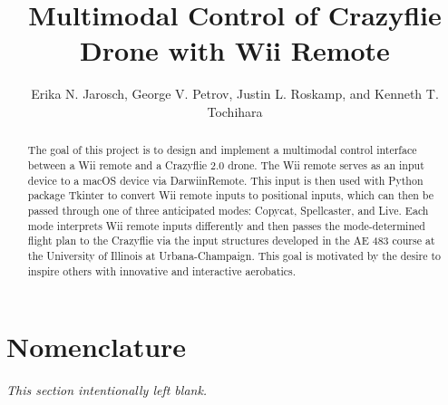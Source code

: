 \documentclass[conf]{new-aiaa}
\title{Multimodal Control of Crazyflie Drone with Wii Remote}
\author{Erika N. Jarosch, George V. Petrov, Justin L. Roskamp, and Kenneth T. Tochihara}
\affil{University of Illinois at Urbana-Champaign, Urbana, IL, 61820}
\begin{document}
\maketitle

\begin{abstract}
The goal of this project is to design and implement a multimodal control interface between a Wii remote and a Crazyflie 2.0 drone. The Wii remote serves as an input device to a macOS device via DarwiinRemote. This input is then used with Python package Tkinter to convert Wii remote inputs to positional inputs, which can then be passed through one of three anticipated modes: Copycat, Spellcaster, and Live. Each mode interprets Wii remote inputs differently and then passes the mode-determined flight plan to the Crazyflie via the input structures developed in the AE 483 course at the University of Illinois at Urbana-Champaign. This goal is motivated by the desire to inspire others with innovative and interactive aerobatics.

\end{abstract}

\section{Nomenclature}
\textit{This section intentionally left blank.}

\end{document}
